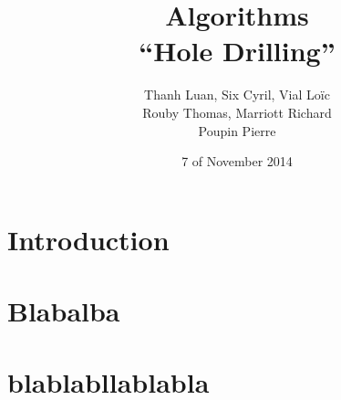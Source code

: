 \documentclass[11pt]{article}
\title{Algorithms \\
	\textbf{``Hole Drilling''}}
\author{Thanh Luan, Six Cyril, Vial Loïc \\
			Rouby Thomas, Marriott Richard\\
			Poupin Pierre}
\date{7\up{th} of November 2014}
\begin{document}
\maketitle
\tableofcontents

\section{Introduction}

\section{Blabalba}

\section{blablabllablabla}
\end{document}
